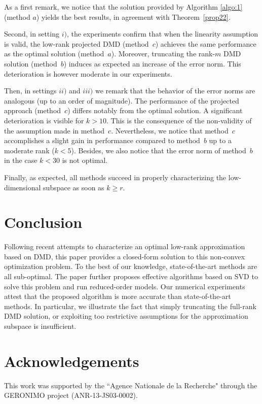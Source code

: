 \documentclass{article}
\def\remCH#1{{\noindent\color{red}{{\footnotesize [CH: #1]}}}}
\begin{document}
As a  first remark, we notice  that the solution provided by Algorithm \ref{algo:1} (method $a$) yields the best results,  in agreement with  {T}heorem~\ref{prop22}. 

Second, in setting  $i)$, the experiments confirm  that when the linearity assumption is valid,  the low-rank projected DMD (method~$c$) achieves the same performance as the optimal solution (method~$a$). Moreover, truncating  the rank-$m$ DMD solution (method~$b$) induces as expected an  increase of the error norm. This deterioration is however moderate in our experiments. 

Then, in  settings $ii)$ and $iii)$ we remark that the behavior of the error norms are  analogous  (up to an order of magnitude).  The {performance} of the projected approach (method~$c$) differs notably from the optimal solution. A significant deterioration is visible for $k>10$. This is the consequence of the non-validity of the assumption made in method~$c$. Nevertheless, we notice that method~$c$ accomplishes a slight gain in performance compared to method~$b$ up to a moderate rank ($k<5$).  
Besides, we also notice that the error norm of method~$b$  in the case $k<30$ is not optimal. 
 
Finally, as expected, all methods succeed  in properly  characterizing the low-dimensional subspace as soon as $k \ge r$.


\section{Conclusion}
Following recent attempts to characterize an optimal low-rank approximation based on DMD, this paper provides a closed-form solution  to this non-convex optimization problem. To the best of our knowledge,  state-of-the-art methods are all  sub-optimal. The paper further proposes effective algorithms based on SVD to solve this problem and run  reduced-order models. %
Our numerical experiments attest that the proposed algorithm is more accurate than state-of-the-art methods. In particular, we illustrate the fact that  simply truncating the full-rank DMD solution, or  exploiting too restrictive assumptions for the approximation subspace is insufficient.   
 
\newpage 


\section*{Acknowledgements}
This work was
supported by the  ``Agence Nationale de la Recherche" through the GERONIMO project (ANR-13-JS03-0002).
\end{document}
